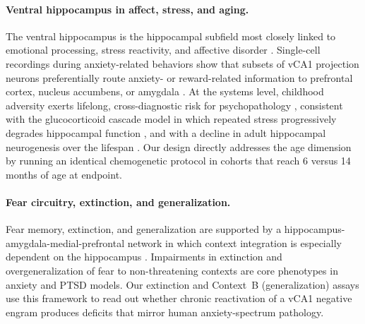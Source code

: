 \paragraph{Ventral hippocampus in affect, stress, and aging.} The ventral hippocampus is the hippocampal subfield most closely linked to emotional processing, stress reactivity, and affective disorder \cite{fanselow2010ventral}. Single-cell recordings during anxiety-related behaviors show that subsets of vCA1 projection neurons preferentially route anxiety- or reward-related information to prefrontal cortex, nucleus accumbens, or amygdala \cite{ciocchi2015vca1}. At the systems level, childhood adversity exerts lifelong, cross-diagnostic risk for psychopathology \cite{kessler2010childhood}, consistent with the glucocorticoid cascade model in which repeated stress progressively degrades hippocampal function \cite{sapolsky1986glucocorticoid}, and with a decline in adult hippocampal neurogenesis over the lifespan \cite{klempin2007neurogenesis}. Our design directly addresses the age dimension by running an identical chemogenetic protocol in cohorts that reach 6 versus 14 months of age at endpoint.

\paragraph{Fear circuitry, extinction, and generalization.} Fear memory, extinction, and generalization are supported by a hippocampus-amygdala-medial-prefrontal network in which context integration is especially dependent on the hippocampus \cite{maren2013contextual,tovote2015circuits}. Impairments in extinction and overgeneralization of fear to non-threatening contexts are core phenotypes in anxiety and PTSD models. Our extinction and Context~B (generalization) assays use this framework to read out whether chronic reactivation of a vCA1 negative engram produces deficits that mirror human anxiety-spectrum pathology.
